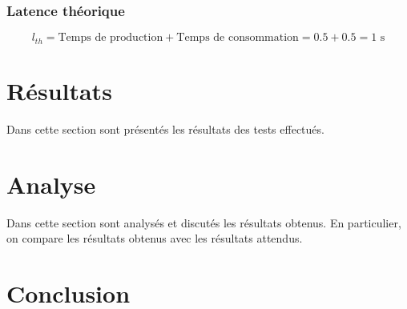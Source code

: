 \documentclass[
  french,
  a4paper,
]{scrartcl}
\begin{document}
\subsubsection*{Latence théorique}

$$
l_{th} = \text{Temps de production} + \text{Temps de consommation} = 0.5 + 0.5 = 1 \text{ s}
$$

\section{Résultats}

Dans cette section sont présentés les résultats des tests effectués. 

\section{Analyse}

Dans cette section sont analysés et discutés les résultats obtenus. En particulier, 
on compare les résultats obtenus avec les résultats attendus.

\section{Conclusion}
 
 
\end{document}
